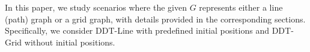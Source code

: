 

In this paper, we study scenarios where the given $G$ represents either a line (path) graph or a grid graph, with details provided in the corresponding sections. Specifically, we consider DDT-Line with predefined initial positions and DDT-Grid without initial positions.

